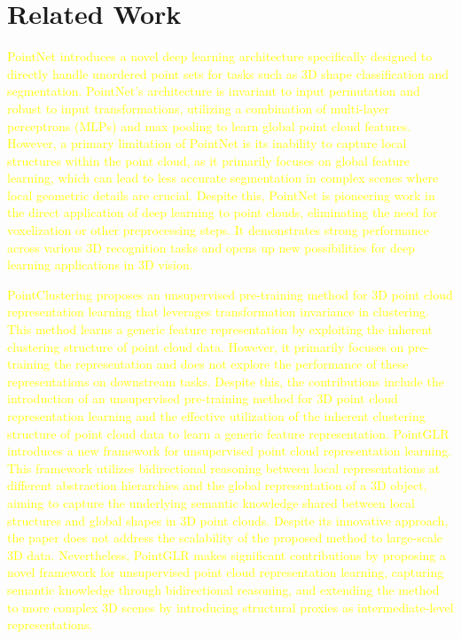 \documentclass[../report.tex]{subfiles}
\begin{document}
    \section{Related Work}
    \label{sec:related_work}
 \textcolor{yellow}{PointNet\cite{charles_pointnet_2017} introduces a novel deep learning architecture specifically designed to directly handle unordered point sets for tasks such as 3D shape classification and segmentation. PointNet's architecture is invariant to input permutation and robust to input transformations, utilizing a combination of multi-layer perceptrons (MLPs) and max pooling to learn global point cloud features. However, a primary limitation of PointNet is its inability to capture local structures within the point cloud, as it primarily focuses on global feature learning, which can lead to less accurate segmentation in complex scenes where local geometric details are crucial. Despite this, PointNet is pioneering work in the direct application of deep learning to point clouds, eliminating the need for voxelization or other preprocessing steps. It demonstrates strong performance across various 3D recognition tasks and opens up new possibilities for deep learning applications in 3D vision.}

\textcolor{yellow}{PointClustering\cite{unsupervised} proposes an unsupervised pre-training method for 3D point cloud representation learning that leverages transformation invariance in clustering. This method learns a generic feature representation by exploiting the inherent clustering structure of point cloud data. However, it primarily focuses on pre-training the representation and does not explore the performance of these representations on downstream tasks. Despite this, the contributions include the introduction of an unsupervised pre-training method for 3D point cloud representation learning and the effective utilization of the inherent clustering structure of point cloud data to learn a generic feature representation.
PointGLR\cite{rao_pointglr_2023} introduces a new framework for unsupervised point cloud representation learning. This framework utilizes bidirectional reasoning between local representations at different abstraction hierarchies and the global representation of a 3D object, aiming to capture the underlying semantic knowledge shared between local structures and global shapes in 3D point clouds. Despite its innovative approach, the paper does not address the scalability of the proposed method to large-scale 3D data. Nevertheless, PointGLR makes significant contributions by proposing a novel framework for unsupervised point cloud representation learning, capturing semantic knowledge through bidirectional reasoning, and extending the method to more complex 3D scenes by introducing structural proxies as intermediate-level representations.}
\end{document}

